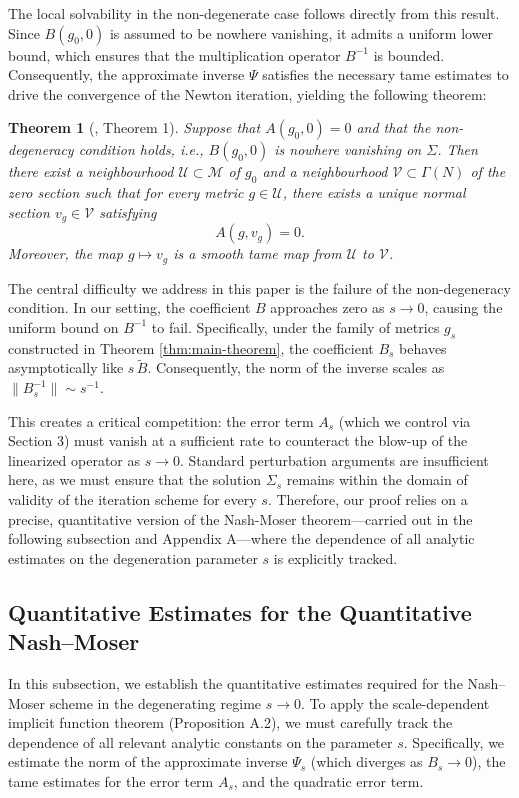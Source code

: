 \documentclass[11pt]{amsart}
\newtheorem{theorem}{Theorem}[section]
\begin{document}
The local solvability in the non-degenerate case follows directly from this result. Since $B(g_0, 0)$ is assumed to be nowhere vanishing, it admits a uniform lower bound, which ensures that the multiplication operator $B^{-1}$ is bounded. Consequently, the approximate inverse $\Psi$ satisfies the necessary tame estimates to drive the convergence of the Newton iteration, yielding the following theorem:

\begin{theorem}[\cite{Donaldson2021}, Theorem 1]
	Suppose that $A(g_0, 0) = 0$ and that the non-degeneracy condition holds, i.e., $B(g_0, 0)$ is nowhere vanishing on $\Sigma$. Then there exist a neighbourhood $\mathcal{U} \subset \mathcal{M}$ of $g_0$ and a neighbourhood $\mathcal{V} \subset \Gamma(N)$ of the zero section such that for every metric $g \in \mathcal{U}$, there exists a unique normal section $v_g \in \mathcal{V}$ satisfying
	\[
	A(g, v_g) = 0.
	\]
	Moreover, the map $g \mapsto v_g$ is a smooth tame map from $\mathcal{U}$ to $\mathcal{V}$.
\end{theorem}

The central difficulty we address in this paper is the failure of the non-degeneracy condition. In our setting, the coefficient $B$ approaches zero as $s \to 0$, causing the uniform bound on $B^{-1}$ to fail. Specifically, under the family of metrics $g_s$ constructed in Theorem \ref{thm:main-theorem}, the coefficient $B_s$ behaves asymptotically like $s\,\widetilde{B}$. Consequently, the norm of the inverse scales as $\|B_s^{-1}\| \sim s^{-1}$.

This creates a critical competition: the error term $A_s$ (which we control via Section 3) must vanish at a sufficient rate to counteract the blow-up of the linearized operator as $s \to 0$. Standard perturbation arguments are insufficient here, as we must ensure that the solution $\Sigma_s$ remains within the domain of validity of the iteration scheme for every $s$. Therefore, our proof relies on a precise, quantitative version of the Nash-Moser theorem—carried out in the following subsection and Appendix A—where the dependence of all analytic estimates on the degeneration parameter $s$ is explicitly tracked.

\subsection{Quantitative Estimates for the Quantitative Nash--Moser}
In this subsection, we establish the quantitative estimates required for the Nash--Moser scheme in the degenerating regime $s \to 0$. To apply the scale-dependent implicit function theorem (Proposition A.2), we must carefully track the dependence of all relevant analytic constants on the parameter $s$. Specifically, we estimate the norm of the approximate inverse $\Psi_s$ (which diverges as $B_s \to 0$), the tame estimates for the error term $A_s$, and the quadratic error term.
\end{document}
